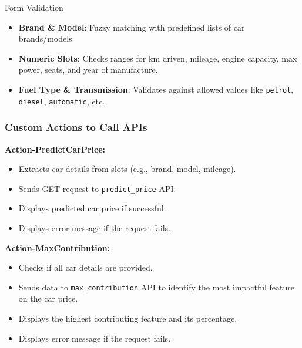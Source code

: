 \documentclass{beamer}
\begin{document}
\begin{frame}{Form Validation}
	\begin{itemize}
		\item \textbf{Brand \& Model}: Fuzzy matching with predefined lists of car brands/models.
		\item \textbf{Numeric Slots}: Checks ranges for km driven, mileage, engine capacity, max power, seats, and year of manufacture.
		\item \textbf{Fuel Type \& Transmission}: Validates against allowed values like \texttt{petrol}, \texttt{diesel}, \texttt{automatic}, etc.
	\end{itemize}
\end{frame}


\begin{frame}
	\frametitle{Custom Actions to Call APIs}

	\textbf{Action-PredictCarPrice:}
	\begin{itemize}
		\item Extracts car details from slots (e.g., brand, model, mileage).
		\item Sends GET request to \texttt{predict\_price} API.
		\item Displays predicted car price if successful.
		\item Displays error message if the request fails.
	\end{itemize}

	\textbf{Action-MaxContribution:}
	\begin{itemize}
		\item Checks if all car details are provided.
		\item Sends data to \texttt{max\_contribution} API to identify the most impactful feature on the car price.
		\item Displays the highest contributing feature and its percentage.
		\item Displays error message if the request fails.
	\end{itemize}
\end{frame}
\end{document}
